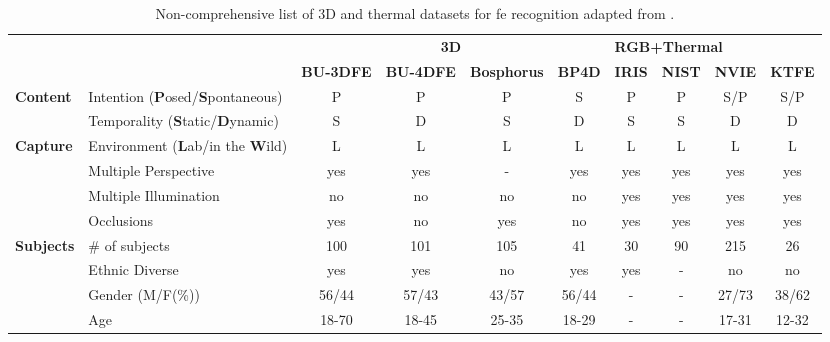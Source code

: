 \begin{sidewaystable}[]
\centering
\caption{Non-comprehensive list of 3D and thermal datasets for \gls{fe} recognition adapted from \cite{Corneanu2016survey}.}
\label{tab:3DThermaldatasets}
\begin{tabular}{llcccccccc}
\toprule
                          &                                         & \multicolumn{4}{c}{\textbf{3D}}                & \multicolumn{4}{l}{\textbf{RGB+Thermal}} \\ \cmidrule(l){3-6}\cmidrule(l){7-10} 
                          &                                         & \textbf{BU-3DFE} & \textbf{BU-4DFE} & \textbf{Bosphorus} & \textbf{BP4D}  & \textbf{IRIS}  & \textbf{NIST}  & \textbf{NVIE}   & \textbf{KTFE}   \\ \midrule
\multirow{2}{*}{\textbf{Content}}  & Intention \footnotesize{(\textbf{P}osed/\textbf{S}pontaneous)}   & P       & P       & P         & S     & P     & P     & S/P    & S/P    \\
                          & Temporality \footnotesize{(\textbf{S}tatic/\textbf{D}ynamic)}    & S       & D       & S         & D     & S     & S     & D      & D      \\ \midrule
\multirow{4}{*}{\textbf{Capture}}  & Environment \footnotesize{(\textbf{L}ab/in the \textbf{W}ild)} & L       & L       & L         & L     & L     & L     & L      & L      \\
                          & Multiple Perspective                    & yes     & yes     & -         & yes   & yes   & yes   & yes    & yes    \\
                          & Multiple Illumination                   & no      & no      & no        & no    & yes   & yes   & yes    & yes    \\
                          & Occlusions                              & yes     & no      & yes       & no    & yes   & yes   & yes    & yes    \\ \midrule
\multirow{4}{*}{\textbf{Subjects}} & \# of subjects                          & 100     & 101     & 105       & 41    & 30    & 90    & 215    & 26     \\
                          & Ethnic Diverse                          & yes     & yes     & no        & yes   & yes   & -     & no     & no     \\
                          & Gender \footnotesize{(M/F(\%))}              & 56/44   & 57/43   & 43/57     & 56/44 & -     & -     & 27/73  & 38/62  \\
                          & Age                                     & 18-70   & 18-45   & 25-35     & 18-29 & -     & -     & 17-31  & 12-32 
\end{tabular}
\end{sidewaystable}

